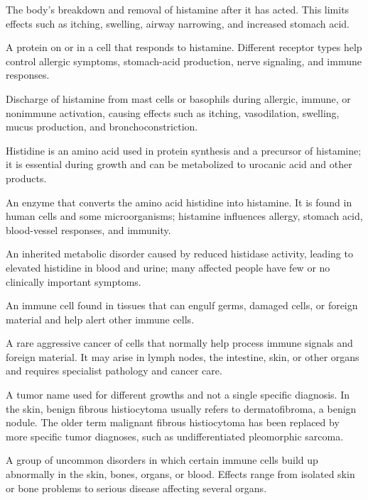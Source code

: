  The body’s breakdown and removal of histamine after it has acted. This limits effects such as itching, swelling, airway narrowing, and increased stomach acid.

 A protein on or in a cell that responds to histamine. Different receptor types help control allergic symptoms, stomach-acid production, nerve signaling, and immune responses.

 Discharge of histamine from mast cells or basophils during allergic, immune, or nonimmune activation, causing effects such as itching, vasodilation, swelling, mucus production, and bronchoconstriction.

 Histidine is an amino acid used in protein synthesis and a precursor of histamine; it is essential during growth and can be metabolized to urocanic acid and other products.

 An enzyme that converts the amino acid histidine into histamine. It is found in human cells and some microorganisms; histamine influences allergy, stomach acid, blood-vessel responses, and immunity.

 An inherited metabolic disorder caused by reduced histidase activity, leading to elevated histidine in blood and urine; many affected people have few or no clinically important symptoms.

 An immune cell found in tissues that can engulf germs, damaged cells, or foreign material and help alert other immune cells.

 A rare aggressive cancer of cells that normally help process immune signals and foreign material. It may arise in lymph nodes, the intestine, skin, or other organs and requires specialist pathology and cancer care.

 A tumor name used for different growths and not a single specific diagnosis. In the skin, benign fibrous histiocytoma usually refers to dermatofibroma, a benign nodule. The older term malignant fibrous histiocytoma has been replaced by more specific tumor diagnoses, such as undifferentiated pleomorphic sarcoma.

 A group of uncommon disorders in which certain immune cells build up abnormally in the skin, bones, organs, or blood. Effects range from isolated skin or bone problems to serious disease affecting several organs.

